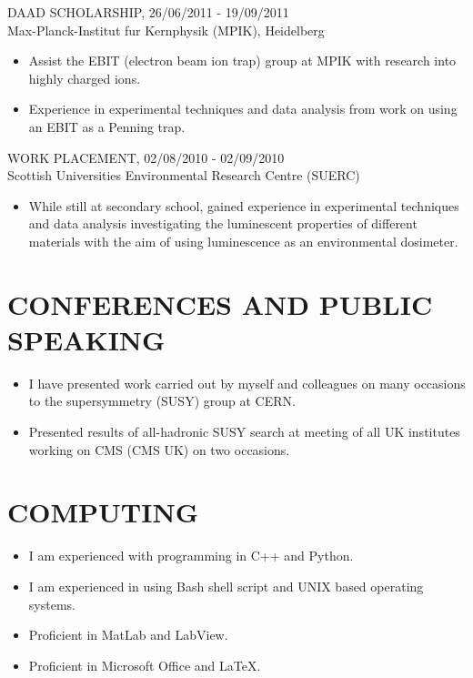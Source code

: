 \documentclass[9pt]{res} %
\begin{document}
\begin{resume}
DAAD SCHOLARSHIP, 26/06/2011 - 19/09/2011\\
\vspace{0.1cm}
Max-Planck-Institut fur Kernphysik (MPIK), Heidelberg
   \begin{itemize}\itemsep -2pt  %
   \item Assist the EBIT (electron beam ion trap) group at MPIK with research into highly charged ions.
   \item Experience in experimental techniques and data analysis from work on using an EBIT as a Penning trap.
   \end{itemize}

WORK PLACEMENT, 02/08/2010 - 02/09/2010\\
\vspace{0.1cm}
Scottish Universities Environmental Research Centre (SUERC)
   \begin{itemize} \itemsep -2pt  %
   \item While still at secondary school, gained experience in experimental techniques and data analysis investigating the luminescent properties of different materials with the aim of using luminescence as an environmental dosimeter.
 \end{itemize}

\section{CONFERENCES AND PUBLIC SPEAKING}
 \begin{itemize}
   \item I have presented work carried out by myself and colleagues on many occasions to the supersymmetry (SUSY) group at CERN.
   \item Presented results of all-hadronic SUSY search at meeting of all UK institutes working on CMS (CMS UK) on two occasions.
 \end{itemize}

\section{COMPUTING}
 \begin{itemize}
   \item I am experienced with programming in C++ and Python.
   \item I am experienced in using Bash shell script and UNIX based operating systems.
   \item Proficient in MatLab and LabView.
   \item Proficient in Microsoft Office and LaTeX.
 \end{itemize}


\end{resume}
\end{document}
